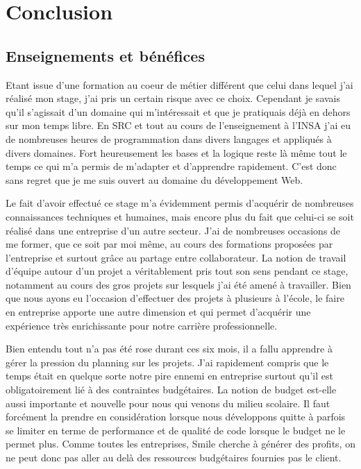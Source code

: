 \documentclass[a4paper,11pt,twoside]{report}
\begin{document}
\chapter*{Conclusion}
  \section*{Enseignements et bénéfices}
  Etant issue d'une formation au coeur de métier différent que celui dans lequel j'ai réalisé mon stage, j'ai pris un certain risque avec ce choix. Cependant je savais qu'il s'agissait d'un domaine qui m'intéressait et que je pratiquais déjà en dehors sur mon temps libre. En SRC et tout au cours de l'enseignement à l'INSA j'ai eu de nombreuses heures de programmation dans divers langages et appliqués à divers domaines. Fort heureusement les bases et la logique reste là même tout le temps ce qui m'a permis de m'adapter et d'apprendre rapidement. C'est donc sans regret que je me suis ouvert au domaine du développement Web.
  
  Le fait d'avoir effectué ce stage m'a évidemment permis d'acquérir de nombreuses connaissances techniques et humaines, mais encore plus du fait que celui-ci se soit réalisé dans une entreprise d'un autre secteur. J'ai de nombreuses occasions de me former, que ce soit par moi même, au cours des formations proposées par l'entreprise et surtout grâce au partage entre collaborateur. La notion de travail d'équipe autour d'un projet a véritablement pris tout son sens pendant ce stage, notamment au cours des gros projets sur lesquels j'ai été amené à travailler. Bien que nous ayons eu l'occasion d'effectuer des projets à plusieurs à l'école, le faire en entreprise apporte une autre dimension et qui permet d'acquérir une expérience très enrichissante pour notre carrière professionnelle.
  
  Bien entendu tout n'a pas été rose durant ces six mois, il a fallu apprendre à gérer la pression du planning sur les projets. J'ai rapidement compris que le temps était en quelque sorte notre pire ennemi en entreprise surtout qu'il est obligatoirement lié à des contraintes budgétaires. La notion de budget est-elle aussi importante et nouvelle pour nous qui venons du milieu scolaire. Il faut forcément la prendre en considération lorsque nous développons quitte à parfois se limiter en terme de performance et de qualité de code lorsque le budget ne le permet plus. Comme toutes les entreprises, Smile cherche à générer des profits, on ne peut donc pas aller au delà des ressources budgétaires fournies pas le client.
  
\end{document}
